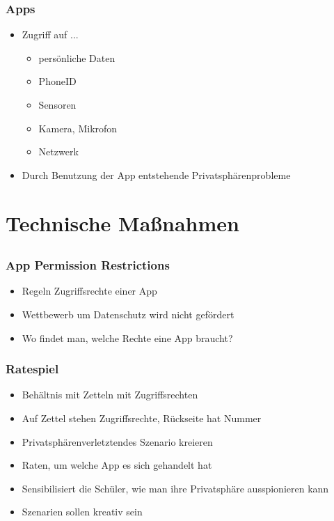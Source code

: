 \documentclass[12pt]{beamer}
\begin{document}
\begin{frame}
	\frametitle{Apps}
	\begin{itemize}
		\item<2-> Zugriff auf ...
		\begin{itemize}
			\item<3-> persönliche Daten
			\item<4-> PhoneID
			\item<5-> Sensoren
			\item<6-> Kamera, Mikrofon
			\item<7-> Netzwerk
		\end{itemize}
		\item<8-> Durch Benutzung der App entstehende Privatsphärenprobleme
	\end{itemize}
\end{frame}

\section{Technische Maßnahmen}
\subsection{}

\begin{frame}
	\frametitle{App Permission Restrictions}
	\begin{itemize}
		\item<2-> Regeln Zugriffsrechte einer App
		\item<3-> Wettbewerb um Datenschutz wird nicht gefördert
		\item<4-> Wo findet man, welche Rechte eine App braucht?
	\end{itemize}
\end{frame}

\begin{frame}
	\frametitle{Ratespiel}
	\begin{itemize}
		\item<2-> Behältnis mit Zetteln mit Zugriffsrechten
		\item<3-> Auf Zettel stehen Zugriffsrechte, Rückseite hat Nummer
		\item<4-> Privatsphärenverletztendes Szenario kreieren
		\item<5-> Raten, um welche App es sich gehandelt hat
		\item<6-> Sensibilisiert die Schüler, wie man ihre Privatsphäre ausspionieren kann
		\item<7-> Szenarien sollen kreativ sein
	\end{itemize}
\end{frame}
\end{document}
